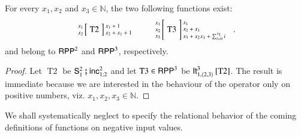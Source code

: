 \begin{lemma}
\label{lemma:triangular number}
For every $ x_1, x_2 $ and $ x_3 \in\mathbb{N}$, the two following functions exist:
$$\arraycolsep=1.4pt
\begin{array}{rcl}
\left. {\scriptsize \begin{array}{r} x_1\\ x_2 \end{array}} \right[
& \operatorname{T2} &
\left] {\scriptsize \begin{array}{l} x_1 + 1\\ x_2+x_1+1 \end{array} } \right.
\end{array}\qquad
\arraycolsep=1.4pt
\begin{array}{rcl}
\left. {\scriptsize \begin{array}{r} x_1\\ x_2\\ x_3 \end{array}} \right[
& \operatorname{T3} &
\left] {\scriptsize \begin{array}{l} x_1\\ x_2 + x_1\\ x_3 + x_2 x_1 + \sum^{x_1}_{i=0} i \end{array} } \right. 
\enspace .
\end{array}$$
and belong to $ \mathsf{RPP}^2 $ and $ \mathsf{RPP}^3 $, respectively.
\end{lemma}
\begin{proof}
Let $\operatorname{T2} $ be $\mathsf{S}^2_1\fatsemi \mathsf{inc}^2_{1;2}$
and let $\operatorname{T3}\in\mathsf{RPP}^3 $ be ${\mathsf{It}^{3}_{1,\langle 2,3\rangle}\left[ \operatorname{T2} \right]}$.
The result is immediate because we are interested in the behaviour of the operator only on positive numbers,
viz.  $ x_1, x_2 , x_3 \in\mathbb{N}$.
\end{proof}

We shall systematically neglect to specify the relational behavior of
the coming definitions of functions on negative input values.
 
